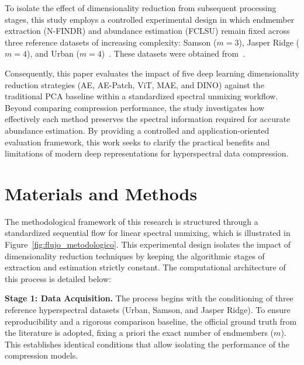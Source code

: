 \documentclass{article}
\begin{document}
To isolate the effect of dimensionality reduction from subsequent processing stages, this study employs a controlled experimental design in which endmember extraction (N-FINDR) and abundance estimation (FCLSU) remain fixed across three reference datasets of increasing complexity: Samson ($m=3$), Jasper Ridge ($m=4$), and Urban ($m=4$)~\cite{gimenez2025hyperspectral}. These datasets were obtained from~\cite{ozkan2018endnet}.


Consequently, this paper evaluates the impact of five deep learning dimensionality reduction strategies (AE, AE-Patch, ViT, MAE, and DINO) against the traditional PCA baseline within a standardized spectral unmixing workflow. Beyond comparing compression performance, the study investigates how effectively each method preserves the spectral information required for accurate abundance estimation. By providing a controlled and application-oriented evaluation framework, this work seeks to clarify the practical benefits and limitations of modern deep representations for hyperspectral data compression.


\section{Materials and Methods}
\label{sec:methodology}

The methodological framework of this research is structured through a standardized sequential flow for linear spectral unmixing, which is illustrated in Figure~\ref{fig:flujo_metodologico}. This experimental design isolates the impact of dimensionality reduction techniques by keeping the algorithmic stages of extraction and estimation strictly constant. The computational architecture of this process is detailed below:

\textbf{Stage 1: Data Acquisition.} The process begins with the conditioning of three reference hyperspectral datasets (Urban, Samson, and Jasper Ridge). To ensure reproducibility and a rigorous comparison baseline, the official ground truth from the literature is adopted, fixing a priori the exact number of endmembers ($m$). This establishes identical conditions that allow isolating the performance of the compression models.
\end{document}
